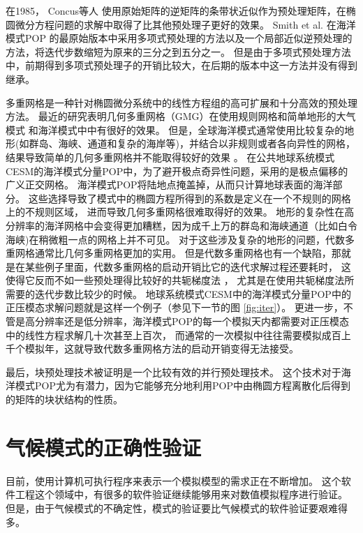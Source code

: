 在1985， Concus等人 \cite{concus1985block} 使用原始矩阵的逆矩阵的条带状近似作为预处理矩阵，在椭圆微分方程问题的求解中取得了比其他预处理子更好的效果。 
Smith et al. \cite{smith1992parallel}在海洋模式POP 的最原始版本中采用多项式预处理的方法以及一个局部近似逆预处理的方法，将迭代步数缩短为原来的三分之到五分之一。
但是由于多项式预处理方法中，前期得到多项式预处理子的开销比较大，在后期的版本中这一方法并没有得到继承。  
 
 
多重网格是一种针对椭圆微分系统中的线性方程组的高可扩展和十分高效的预处理方法。 
最近的研究表明几何多重网格（GMG）在使用规则网格和简单地形的大气模式
 \cite{muller2014massively}和海洋模式中\cite{matsumura2008non,kanarska2007algorithm}中有很好的效果。 
但是，全球海洋模式通常使用比较复杂的地形(如群岛、海峡、通道和复杂的海岸等)，并结合以非规则或者各向异性的网格， 结果导致简单的几何多重网格并不能取得较好的效果
\cite{matsumura2008non,fulton1986multigrid,tseng2003ghost,stuben2001review}。 
在公共地球系统模式CESM的海洋模式分量POP中，为了避开极点奇异性问题，采用的是极点偏移的广义正交网格。 
海洋模式POP将陆地点掩盖掉，从而只计算地球表面的海洋部分。
这些选择导致了模式中的椭圆方程所得到的系数是定义在一个不规则的网格上的不规则区域， 进而导致几何多重网格很难取得好的效果。 
地形的复杂性在高分辨率的海洋网格中会变得更加糟糕，因为成千上万的群岛和海峡通道（比如白令海峡)在稍微粗一点的网格上并不可见。
对于这些涉及复杂的地形的问题，代数多重网格通常比几何多重网格更加的实用。 
但是代数多重网格也有一个缺陷，那就是在某些例子里面，代数多重网格的启动开销比它的迭代求解过程还要耗时，
这使得它反而不如一些预处理得比较好的共轭梯度法
\cite{muller2014massively}， 尤其是在使用共轭梯度法所需要的迭代步数比较少的时候。 
地球系统模式CESM中的海洋模式分量POP中的正压模态求解问题就是这样一个例子（参见下一节的图
 \ref{fig:iter}）。
更进一步，不管是高分辨率还是低分辨率，海洋模式POP的每一个模拟天内都需要对正压模态中的线性方程求解几十次甚至上百次，
而通常的一次模拟中往往需要模拟成百上千个模拟年，这就导致代数多重网格方法的启动开销变得无法接受。


最后，块预处理技术被证明是一个比较有效的并行预处理技术\cite{concus1985block, white2011block}。
这个技术对于海洋模式POP尤为有潜力，因为它能够充分地利用POP中由椭圆方程离散化后得到的矩阵的块状结构的性质。 

\section{气候模式的正确性验证}
\label{related:verify}

目前，使用计算机可执行程序来表示一个模拟模型的需求正在不断增加。 
这个软件工程这个领域中，有很多的软件验证继续能够用来对数值模拟程序进行验证。
但是，由于气候模式的不确定性，模式的验证要比气候模式的软件验证要艰难得多。
 


